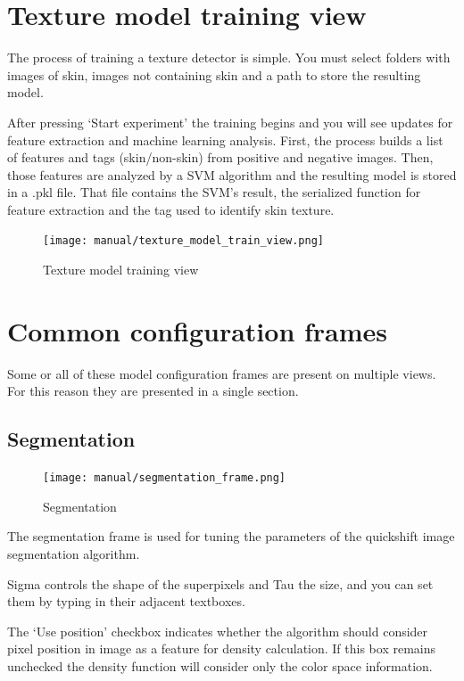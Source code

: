 \documentclass[12pt]{report}
\begin{document}
	\section{Texture model training view}
	The process of training a texture detector is simple. You must select folders with images of skin, images not containing skin and a path to store the resulting model.
	
	After pressing ‘Start experiment’ the training begins and you will see updates for feature extraction and machine learning analysis. First, the process builds a list of features and tags (skin/non-skin) from positive and negative images. Then, those features are analyzed by a SVM algorithm and the resulting model is stored in a .pkl file. That file contains the SVM's result, the serialized function for feature extraction and the tag used to identify skin texture.
	
	\begin{figure}[h!]
		\centering
		\texttt{[image: manual/texture\_model\_train\_view.png]}
		\caption{Texture model training view}
	\end{figure}

	\section{Common configuration frames} \label{configuration_frames}
	Some or all of these model configuration frames are present on multiple views. For this reason they are presented in a single section.
	
	\subsection{Segmentation}
	
	\begin{figure}
		\begin{center}
			\texttt{[image: manual/segmentation\_frame.png]}
		\end{center}
		\caption{Segmentation}
	\end{figure}

	The segmentation frame is used for tuning the parameters of the quickshift image segmentation algorithm. 
	
	Sigma controls the shape of the superpixels and Tau the size, and you can set them by typing in their adjacent textboxes. 
	
	The ‘Use position’ checkbox indicates whether the algorithm should consider pixel position in image as a feature for density calculation. If this box remains unchecked the density function will consider only the color space information.
	
\end{document}
